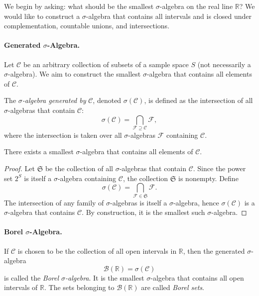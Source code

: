 We begin by asking: what should be the smallest $\sigma$-algebra on the real line $\mathbb{R}$?  
We would like to construct a $\sigma$-algebra that contains all intervals and is closed under complementation, countable unions, and intersections.

\paragraph{Generated $\sigma$-Algebra.}
Let $\mathcal{C}$ be an arbitrary collection of subsets of a sample space $S$ (not necessarily a $\sigma$-algebra).  
We aim to construct the smallest $\sigma$-algebra that contains all elements of $\mathcal{C}$.

\begin{definition}
The \emph{$\sigma$-algebra generated by} $\mathcal{C}$, denoted $\sigma(\mathcal{C})$, is defined as the intersection of all $\sigma$-algebras that contain $\mathcal{C}$:
\[
\sigma(\mathcal{C}) = \bigcap_{\mathcal{F} \supseteq \mathcal{C}} \mathcal{F},
\]
where the intersection is taken over all $\sigma$-algebras $\mathcal{F}$ containing $\mathcal{C}$.
\end{definition}

\begin{theorem}
There exists a smallest $\sigma$-algebra that contains all elements of $\mathcal{C}$.
\end{theorem}

\begin{proof}
Let $\mathfrak{S}$ be the collection of all $\sigma$-algebras that contain $\mathcal{C}$.  
Since the power set $2^S$ is itself a $\sigma$-algebra containing $\mathcal{C}$, the collection $\mathfrak{S}$ is nonempty.  
Define
\[
\sigma(\mathcal{C}) = \bigcap_{\mathcal{F} \in \mathfrak{S}} \mathcal{F}.
\]
The intersection of any family of $\sigma$-algebras is itself a $\sigma$-algebra, hence $\sigma(\mathcal{C})$ is a $\sigma$-algebra that contains $\mathcal{C}$.  
By construction, it is the smallest such $\sigma$-algebra.
\end{proof}

\paragraph{Borel $\sigma$-Algebra.}
If $\mathcal{C}$ is chosen to be the collection of all open intervals in $\mathbb{R}$, then the generated $\sigma$-algebra
\[
\mathcal{B}(\mathbb{R}) = \sigma(\mathcal{C})
\]
is called the \emph{Borel $\sigma$-algebra}.  
It is the smallest $\sigma$-algebra that contains all open intervals of $\mathbb{R}$.  
The sets belonging to $\mathcal{B}(\mathbb{R})$ are called \emph{Borel sets}.



